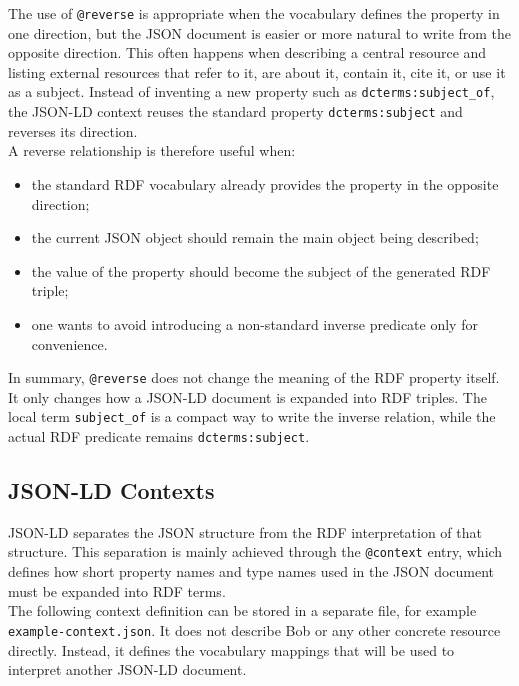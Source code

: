 \documentclass{scrbook}
\begin{document}
	The use of \texttt{@reverse} is appropriate when the vocabulary defines the property in one direction, but the JSON document is easier or more natural to write from the opposite direction. This often happens when describing a central resource and listing external resources that refer to it, are about it, contain it, cite it, or use it as a subject. Instead of inventing a new property such as \texttt{dcterms:subject\_of}, the JSON-LD context reuses the standard property \texttt{dcterms:subject} and reverses its direction.\\
	
	A reverse relationship is therefore useful when:
	\begin{itemize}
		\item the standard RDF vocabulary already provides the property in the opposite direction;
		\item the current JSON object should remain the main object being described;
		\item the value of the property should become the subject of the generated RDF triple;
		\item one wants to avoid introducing a non-standard inverse predicate only for convenience.
	\end{itemize}
	
	In summary, \texttt{@reverse} does not change the meaning of the RDF property itself. It only changes how a JSON-LD document is expanded into RDF triples. The local term \texttt{subject\_of} is a compact way to write the inverse relation, while the actual RDF predicate remains \texttt{dcterms:subject}.
	
	\subsection{JSON-LD Contexts}
	
	JSON-LD separates the JSON structure from the RDF interpretation of that structure. This separation is mainly achieved through the \texttt{@context} entry, which defines how short property names and type names used in the JSON document must be expanded into RDF terms.\\
	
	The following context definition can be stored in a separate file, for example \texttt{example-context.json}. It does not describe Bob or any other concrete resource directly. Instead, it defines the vocabulary mappings that will be used to interpret another JSON-LD document.
	
\end{document}
